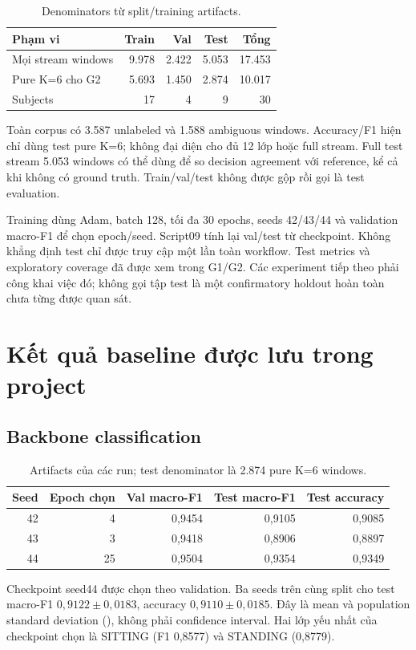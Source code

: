 \documentclass[11pt,a4paper]{article}
\newcommand{\code}[1]{\texttt{\detokenize{#1}}}
\begin{document}
\begin{table}[ht]
\centering\small
\begin{tabular}{lrrrr}
\toprule
Phạm vi & Train & Val & Test & Tổng\\
\midrule
Mọi stream windows & 9.978 & 2.422 & 5.053 & 17.453\\
Pure K=6 cho G2 & 5.693 & 1.450 & 2.874 & 10.017\\
Subjects & 17 & 4 & 9 & 30\\
\bottomrule
\end{tabular}
\caption{Denominators từ split/training artifacts.}\label{tab:split}
\end{table}

Toàn corpus có 3.587 unlabeled và 1.588 ambiguous windows. Accuracy/F1 hiện
chỉ dùng test pure K=6; không đại diện cho đủ 12 lớp hoặc full stream.
Full test stream 5.053 windows có thể dùng để so decision agreement với
reference, kể cả khi không có ground truth. Train/val/test không được gộp
rồi gọi là test evaluation.

Training dùng Adam, batch 128, tối đa 30 epochs, seeds 42/43/44 và validation
macro-F1 để chọn epoch/seed. Script09 tính lại val/test từ checkpoint.
Không khẳng định test chỉ được truy cập một lần toàn workflow.
Test metrics và exploratory coverage đã được xem trong G1/G2. Các experiment
tiếp theo phải công khai việc đó; không gọi tập test là một confirmatory
holdout hoàn toàn chưa từng được quan sát.

\section{Kết quả baseline được lưu trong project}
\subsection{Backbone classification}
\begin{table}[ht]
\centering\small
\begin{tabular}{rrrrr}
\toprule
Seed & Epoch chọn & Val macro-F1 & Test macro-F1 & Test accuracy\\
\midrule
42 & 4 & 0,9454 & 0,9105 & 0,9085\\
43 & 3 & 0,9418 & 0,8906 & 0,8897\\
44 & 25 & 0,9504 & 0,9354 & 0,9349\\
\bottomrule
\end{tabular}
\caption{Artifacts của các run; test denominator là 2.874 pure K=6 windows.}
\end{table}
Checkpoint seed44 được chọn theo validation. Ba seeds trên cùng split cho
test macro-F1 \(0{,}9122\pm0{,}0183\), accuracy \(0{,}9110\pm0{,}0185\).
Đây là mean và population standard deviation (\code{ddof=0}), không phải
confidence interval. Hai lớp yếu nhất của checkpoint chọn là SITTING
(F1 0,8577) và STANDING (0,8779).
\end{document}
